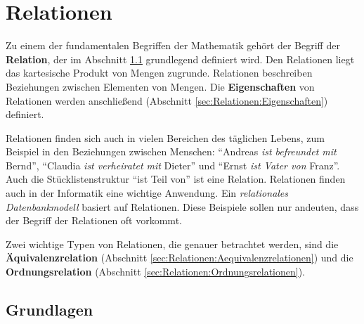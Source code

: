 
\chapter{Relationen}
\label{cha:Gdl-K05-Relationen}

Zu einem der fundamentalen Begriffen der Mathematik gehört der Begriff der
\textbf{Relation}, der im Abschnitt \ref{sec:Relationen:Grundlagen} 
grundlegend definiert wird. Den Relationen liegt das kartesische Produkt von 
Mengen zugrunde. Relationen beschreiben Beziehungen zwischen Elementen von 
Mengen. Die \textbf{Eigenschaften} von Relationen werden anschließend 
(Abschnitt \ref{sec:Relationen:Eigenschaften}) definiert.

Relationen finden sich auch in vielen Bereichen des täglichen Lebens, zum 
Beispiel in den Beziehungen zwischen Menschen: \enquote{Andreas \emph{ist
befreundet mit} Bernd}, \enquote{Claudia \emph{ist verheiratet mit} Dieter}
und \enquote{Ernst \emph{ist Vater von} Franz}. Auch die Stücklistenstruktur
\enquote{ist Teil von} ist eine Relation. Relationen finden auch in der 
Informatik eine wichtige Anwendung. Ein \emph{relationales
Datenbankmodell} basiert auf Relationen. Diese Beispiele sollen nur
andeuten, dass der Begriff der Relationen oft vorkommt.

Zwei wichtige Typen von Relationen, die genauer betrachtet werden, sind die 
\textbf{Äquivalenzrelation} (Abschnitt 
\ref{sec:Relationen:Aequivalenzrelationen}) und die \textbf{Ordnungsrelation}
(Abschnitt \ref{sec:Relationen:Ordnungsrelationen}).


\section{Grundlagen}
\label{sec:Relationen:Grundlagen}


